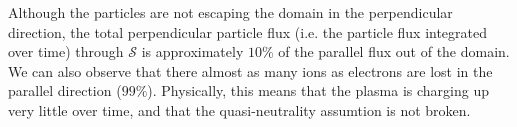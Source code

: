 Although the particles are not escaping the domain in the perpendicular direction, the total perpendicular particle flux (i.e. the particle flux integrated over time) through $\mathcal{S}$
is approximately $10\%$ of the parallel flux out of the domain.
We can also observe that there almost as many ions as electrons are lost in the parallel direction ($99\%$).
Physically, this means that the plasma is charging up very little over time, and that the quasi-neutrality assumtion is not broken.
